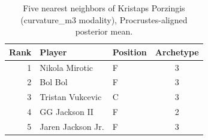 \begin{table}[htbp]
  \centering\small
  \begin{tabular}{rllc}
    \toprule
    Rank & Player & Position & Archetype \\
    \midrule
    1 & Nikola Mirotic & F & 3 \\
    2 & Bol Bol & F & 3 \\
    3 & Tristan Vukcevic & C & 3 \\
    4 & GG Jackson II & F & 2 \\
    5 & Jaren Jackson Jr. & F & 3 \\
    \bottomrule
  \end{tabular}
  \caption{Five nearest neighbors of Kristaps Porzingis (curvature_m3 modality), Procrustes-aligned posterior mean.}
  \label{tab:Kristaps_Porzingis_neighbors_curvature_m3}
\end{table}

